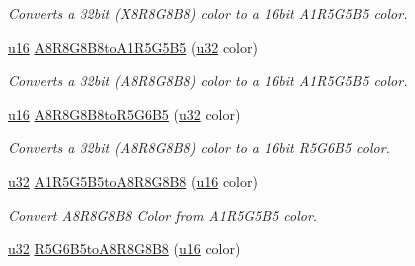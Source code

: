 \begin{DoxyCompactItemize}
\begin{DoxyCompactList}\small\item\em Converts a 32bit (X8\+R8\+G8\+B8) color to a 16bit A1\+R5\+G5\+B5 color. \end{DoxyCompactList}\item 
\hyperlink{namespaceirr_ae9f8ec82692ad3b83c21f555bfa70bcc}{u16} \hyperlink{namespaceirr_1_1video_a929c6758a0edc772cf69b2c674e4f5cd}{A8\+R8\+G8\+B8to\+A1\+R5\+G5\+B5} (\hyperlink{namespaceirr_a0416a53257075833e7002efd0a18e804}{u32} color)\hypertarget{namespaceirr_1_1video_a929c6758a0edc772cf69b2c674e4f5cd}{}\label{namespaceirr_1_1video_a929c6758a0edc772cf69b2c674e4f5cd}

\begin{DoxyCompactList}\small\item\em Converts a 32bit (A8\+R8\+G8\+B8) color to a 16bit A1\+R5\+G5\+B5 color. \end{DoxyCompactList}\item 
\hyperlink{namespaceirr_ae9f8ec82692ad3b83c21f555bfa70bcc}{u16} \hyperlink{namespaceirr_1_1video_a10636302b225d7f525fa46bbd3f747a4}{A8\+R8\+G8\+B8to\+R5\+G6\+B5} (\hyperlink{namespaceirr_a0416a53257075833e7002efd0a18e804}{u32} color)\hypertarget{namespaceirr_1_1video_a10636302b225d7f525fa46bbd3f747a4}{}\label{namespaceirr_1_1video_a10636302b225d7f525fa46bbd3f747a4}

\begin{DoxyCompactList}\small\item\em Converts a 32bit (A8\+R8\+G8\+B8) color to a 16bit R5\+G6\+B5 color. \end{DoxyCompactList}\item 
\hyperlink{namespaceirr_a0416a53257075833e7002efd0a18e804}{u32} \hyperlink{namespaceirr_1_1video_a8aa9e69faa25064379df5a91273b9fbe}{A1\+R5\+G5\+B5to\+A8\+R8\+G8\+B8} (\hyperlink{namespaceirr_ae9f8ec82692ad3b83c21f555bfa70bcc}{u16} color)
\begin{DoxyCompactList}\small\item\em Convert A8\+R8\+G8\+B8 Color from A1\+R5\+G5\+B5 color. \end{DoxyCompactList}\item 
\hyperlink{namespaceirr_a0416a53257075833e7002efd0a18e804}{u32} \hyperlink{namespaceirr_1_1video_a421971627afe81533a3c2b51907b72bd}{R5\+G6\+B5to\+A8\+R8\+G8\+B8} (\hyperlink{namespaceirr_ae9f8ec82692ad3b83c21f555bfa70bcc}{u16} color)\hypertarget{namespaceirr_1_1video_a421971627afe81533a3c2b51907b72bd}{}\label{namespaceirr_1_1video_a421971627afe81533a3c2b51907b72bd}


\end{DoxyCompactItemize}
